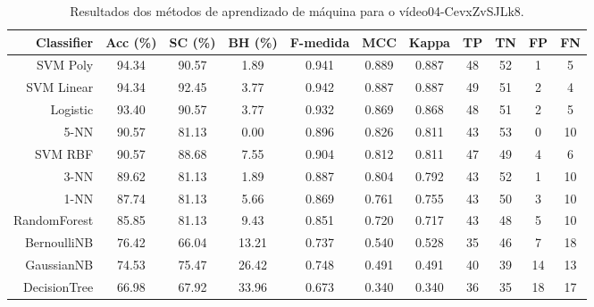\begin{table}[!htb]
\centering
\caption{Resultados dos métodos de aprendizado de máquina para o vídeo04-CevxZvSJLk8.}
\label{tab:04-CevxZvSJLk8}
\begin{tabular}{r|c|c|c|c|c|c|c|c|c|c}
\hline\hline
Classifier & Acc (\%) & SC (\%) & BH (\%) & F-medida & MCC & Kappa & TP & TN & FP & FN \\ \hline
SVM Poly & 94.34 & 90.57 & 1.89 & 0.941 & 0.889 & 0.887 & 48 & 52 & 1 & 5 \\ 
SVM Linear & 94.34 & 92.45 & 3.77 & 0.942 & 0.887 & 0.887 & 49 & 51 & 2 & 4 \\ 
Logistic & 93.40 & 90.57 & 3.77 & 0.932 & 0.869 & 0.868 & 48 & 51 & 2 & 5 \\ 
5-NN & 90.57 & 81.13 & 0.00 & 0.896 & 0.826 & 0.811 & 43 & 53 & 0 & 10 \\ 
SVM RBF & 90.57 & 88.68 & 7.55 & 0.904 & 0.812 & 0.811 & 47 & 49 & 4 & 6 \\ 
3-NN & 89.62 & 81.13 & 1.89 & 0.887 & 0.804 & 0.792 & 43 & 52 & 1 & 10 \\ 
1-NN & 87.74 & 81.13 & 5.66 & 0.869 & 0.761 & 0.755 & 43 & 50 & 3 & 10 \\ 
RandomForest & 85.85 & 81.13 & 9.43 & 0.851 & 0.720 & 0.717 & 43 & 48 & 5 & 10 \\ 
BernoulliNB & 76.42 & 66.04 & 13.21 & 0.737 & 0.540 & 0.528 & 35 & 46 & 7 & 18 \\ 
GaussianNB & 74.53 & 75.47 & 26.42 & 0.748 & 0.491 & 0.491 & 40 & 39 & 14 & 13 \\ 
DecisionTree & 66.98 & 67.92 & 33.96 & 0.673 & 0.340 & 0.340 & 36 & 35 & 18 & 17 \\ 
\hline\hline
\end{tabular}
\end{table}
